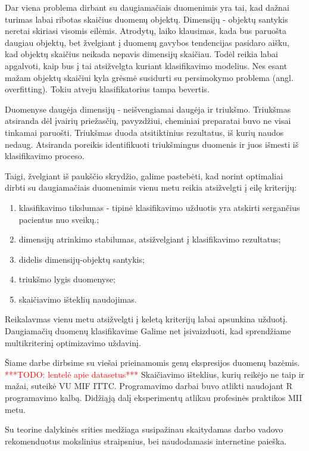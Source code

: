 Dar viena problema dirbant su daugiamačiais duomenimis yra tai, kad dažnai
turimas labai ribotas skaičius duomenų objektų. Dimensijų - objektų santykis 
neretai skiriasi visomis eilėmis. Atrodytų, laiko klausimas, kada bus paruošta
daugiau objektų, bet žvelgiant į duomenų gavybos tendencijas pasidaro aišku, kad
objektų skaičius neikada nepavis dimensijų skaičiau. Todėl reikia labai apgalvoti,
kaip bus į tai atsižvelgta kuriant klasifikavimo modelius. Nes esant mažam
objektų skaičiui kyla grėsmė susidurti su persimokymo problema (angl. 
overfitting). Tokiu atveju klasifikatorius tampa bevertis.

Duomenyse daugėja dimensijų - neišvengiamai daugėja ir triukšmo. Triukšmas atsiranda
dėl įvairių priežasčių, pavyzdžiui, cheminiai preparatai buvo ne visai tinkamai
paruošti. Triukšmas duoda atsitiktinius rezultatus, iš kurių naudos nedaug.
Atsiranda poreikis identifikuoti triukšmingus duomenis ir juos išmesti iš 
klasifikavimo proceso.

Taigi, žvelgiant iš paukščio skrydžio, galime pastebėti, kad norint optimaliai
dirbti su daugiamačiais duomenimis vienu metu reikia atsižvelgti į eilę kriterijų:
\begin{enumerate}
 \item klasifikavimo tikslumas - tipinė klasifikavimo užduotis yra atskirti
 sergančius pacientus nuo sveikų.;
 \item dimensijų atrinkimo stabilumas, atsižvelgiant į klasifikavimo rezultatus;
 \item didelis dimensijų-objektų santykis;
 \item triukšmo lygis duomenyse;
 \item skaičiavimo išteklių naudojimas.
\end{enumerate}
Reikalavmas vienu metu atsižvelgti į keletą kriterijų labai apsunkina užduotį.
Daugiamačių duomenų klasifikavime
Galime net įsivaizduoti, kad sprendžiame multikriterinį optimizavimo uždavinį.

Šiame darbe dirbsime su viešai prieinamomis genų ekspresijos duomenų bazėmis.
\textcolor{red}{***TODO: lentelė apie datasetus***}
Skaičiavimo išteklius, kurių reikėjo ne taip ir mažai, suteikė VU MIF ITTC.
Programavimo darbai buvo atlikti naudojant R programavimo kalbą. Didžiąją
dalį eksperimentų atlikau profesinės praktikos MII metu.

Su teorine dalykinės srities medžiaga susipažinau skaitydamas darbo vadovo 
rekomenduotus mokslinius straipsnius, bei naudodamasis internetine paieška.

